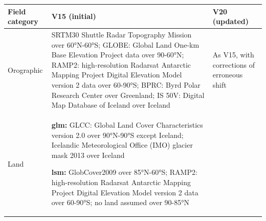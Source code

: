 \documentclass[hess, twostagejnl]{copernicus}
\providecommand{\DIFadd}[1]{{\protect\color{blue} \sf #1}} %
\providecommand{\DIFaddFL}[1]{\DIFadd{#1}} %
\begin{document}
\begin{table}
	\begin{tabularx}{\textwidth}{lXX}
		\toprule 
		\DIFaddFL{Field category }& \DIFaddFL{V15 (initial) }& \DIFaddFL{V20 (updated) }\\
		\hline
		\DIFaddFL{Orographic }& \DIFaddFL{SRTM30 Shuttle Radar Topography Mission over 60°N-60°S; GLOBE: Global Land One-km Base Elevation Project data over 90-60°N; RAMP2: high-resolution Radarsat Antarctic Mapping Project Digital Elevation Model version 2 data \citep{Liu2015} over 60-90°S; BPRC: Byrd Polar Research Center over Greenland; IS 50V: Digital Map Database of Iceland over Iceland }& \DIFaddFL{As V15, with corrections of erroneous shift
		}\\
		\hline 
			\DIFaddFL{Land }&	\DIFaddFL{\textbf{glm:} GLCC: Global Land Cover Characteristics version 2.0 over 90°N-90°S except Iceland; Icelandic Meteorological Office (IMO) glacier mask 2013 over Iceland }\newline 
		\DIFaddFL{\textbf{lsm:} GlobCover2009 \citep{GLOBCOVER,arino2012glcm} over 85°N-60°S; RAMP2: high-resolution Radarsat Antarctic Mapping Project Digital Elevation Model version 2 data \citep{Liu2015} over 60-90°S; no land assumed over 90-85°N   

}


\end{tabularx}
\end{table}
\end{document}
